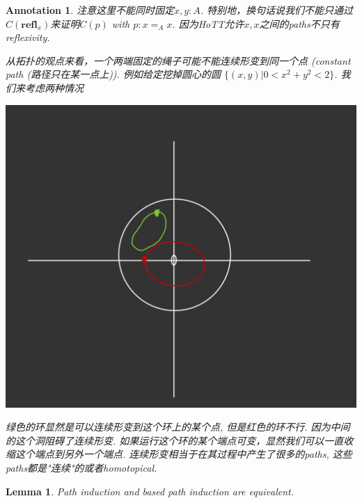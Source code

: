 \documentclass{article}
\newtheorem{lemma}[theorem]{Lemma}
\newtheorem{annotation}[theorem]{Annotation}
\newcommand{\refl}{\textbf{refl}}
\begin{document}
\begin{annotation}
\rm 注意这里不能同时固定$x,y : A$. 特别地，换句话说我们不能只通过$C(\refl_x)$来证明$C(p)$ with $p : x =_A x$. 因为HoTT允许$x, x$之间的paths不只有reflexivity.

从拓扑的观点来看，一个两端固定的绳子可能不能连续形变到同一个点 (constant path (路径只在某一点上)). 例如给定挖掉圆心的圆 $\{(x,y) | 0 < x^2 + y^2 < 2\}$. 我们来考虑两种情况
\begin{center}
    \includegraphics[scale=0.1]{images/topo1.png}
\end{center}
绿色的环显然是可以连续形变到这个环上的某个点, 但是红色的环不行. 因为中间的这个洞阻碍了连续形变. 如果运行这个环的某个端点可变，显然我们可以一直收缩这个端点到另外一个端点. 连续形变相当于在其过程中产生了很多的paths, 这些paths都是"连续"的或者homotopical.
\end{annotation}

\begin{lemma}
\rm Path induction and based path induction are equivalent.
\end{lemma}
\end{document}
